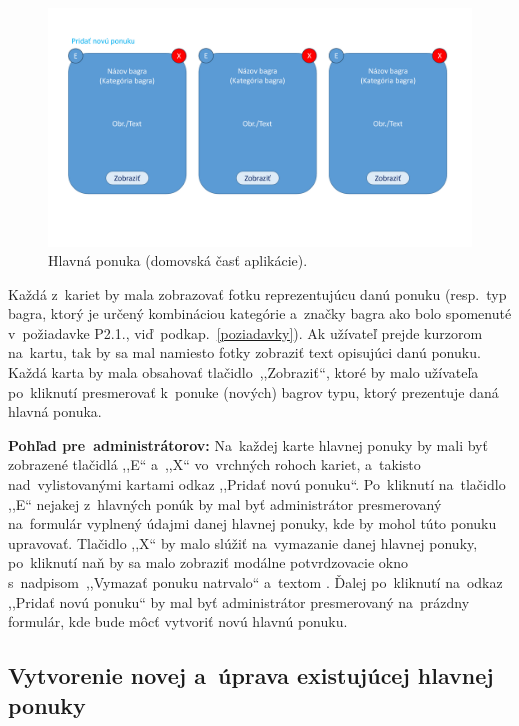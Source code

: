 \begin{figure}[H]\centering
\includegraphics[width=140mm]{../img/UI concept/main offer cards}
\caption{Hlavná ponuka (domovská časť aplikácie).}
\label{main offer cards}
\end{figure}

Každá z~kariet by mala zobrazovať fotku reprezentujúcu danú ponuku (resp.~typ bagra, ktorý je určený kombináciou kategórie a~značky bagra ako bolo spomenuté v~požiadavke P2.1., viď~podkap.~\ref{poziadavky}). Ak užívateľ prejde kurzorom na~kartu, tak by sa mal namiesto fotky zobraziť text opisujúci danú ponuku. Každá karta by mala obsahovať tlačidlo~,,Zobraziť``, ktoré by malo užívateľa po~kliknutí presmerovať k~ponuke (nových) bagrov typu, ktorý prezentuje daná hlavná ponuka.

\textbf{Pohľad pre~administrátorov:} Na~každej karte hlavnej ponuky by mali byť zobrazené tlačidlá ,,E`` a~,,X`` vo~vrchných rohoch kariet, a~takisto nad~vylistovanými kartami odkaz ,,Pridať novú ponuku``. Po~kliknutí na~tlačidlo ,,E`` nejakej z~hlavných ponúk by mal byť administrátor presmerovaný na~formulár vyplnený údajmi danej hlavnej ponuky, kde by mohol túto ponuku upravovať. Tlačidlo ,,X`` by malo slúžiť na~vymazanie danej hlavnej ponuky, po~kliknutí naň by sa malo zobraziť modálne potvrdzovacie okno s~nadpisom~,,Vymazať ponuku natrvalo`` a~textom . Ďalej po~kliknutí na~odkaz ,,Pridať novú ponuku`` by mal byť administrátor presmerovaný na~prázdny formulár, kde bude môcť vytvoriť novú hlavnú ponuku.

\subsection{Vytvorenie novej a~úprava existujúcej hlavnej ponuky}
\label{vytvorenie novej a uprava existujucej hlavnej ponuky}

